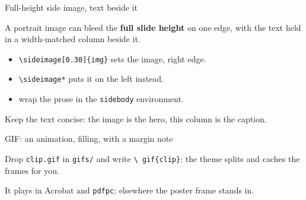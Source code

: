 \documentclass[aspectratio=169]{beamer}
\begin{document}
\begin{frame}{Full-height side image, text beside it}
  \begin{sidebody}
    A portrait image can bleed the \textbf{full slide height} on one edge, with
    the text held in a \textcolor{DHBWred}{width-matched} column beside it.
    \begin{itemize}
      \item \texttt{\textbackslash sideimage[0.30]\{img\}} sets the image, right edge.
      \item \texttt{\textbackslash sideimage*} puts it on the left instead.
      \item wrap the prose in the \texttt{sidebody} environment.
    \end{itemize}
    Keep the text concise: the image is the hero, this column is the caption.
  \end{sidebody}
\end{frame}

\begin{frame}{GIF: an animation, filling, with a margin note}
  \begin{withmargin}
    \begin{gifmain}
    \end{gifmain}
    \begin{tdmargin}
      Drop \texttt{clip.gif} in \texttt{gifs/} and write \texttt{\textbackslash
      gif\{clip\}}: the theme splits and caches the frames for you.
      \par\smallskip
      It plays in Acrobat and \texttt{pdfpc}; elsewhere the
      \textcolor{DHBWred}{poster} frame stands in.
    \end{tdmargin}
  \end{withmargin}
\end{frame}
\end{document}

